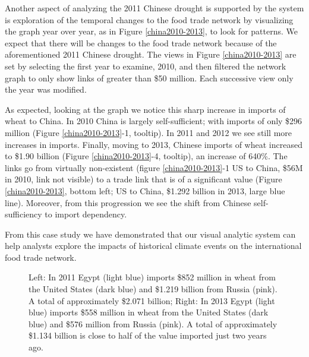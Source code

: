 Another aspect of analyzing the 2011 Chinese drought is supported by the system is exploration of the temporal changes to the food trade network by visualizing the graph year over year, as in Figure \ref{china2010-2013}, to look for patterns. We expect that there will be changes to the food trade network because of the aforementioned 2011 Chinese drought. The views in Figure \ref{china2010-2013} are set by selecting the first year to examine, 2010, and then filtered the network graph to only show links of greater than \$50 million. Each successive view only the year was modified.\par
As expected, looking at the graph we notice this sharp increase in imports of wheat to China. In 2010 China is largely self-sufficient; with imports of only \$296 million (Figure \ref{china2010-2013}-1, tooltip). In 2011 and 2012 we see still more increases in imports. Finally, moving to 2013, Chinese imports of wheat increased to \$1.90 billion (Figure \ref{china2010-2013}-4, tooltip), an increase of 640\%. The links go from virtually non-existent (figure \ref{china2010-2013}-1 US to China, \$56M in 2010, link not visible) to a trade link that is of a significant value (Figure \ref{china2010-2013}, bottom left; US to China, \$1.292 billion in 2013, large blue line). Moreover, from this progression we see the shift from Chinese self-sufficiency to import dependency.\par
From this case study we have demonstrated that our visual analytic system can help analysts explore the impacts of historical climate events on the international food trade network. 
\begin{figure}[htb]
	\caption[PROGRESSION OF EGYPT WHEAT IMPORTS FROM 2011 TO 2013]{Left: {In 2011 Egypt (light blue) imports \$852 million in wheat from the United States (dark blue) and \$1.219 billion from Russia (pink). A total of approximately \$2.071 billion}; Right: {In 2013 Egypt (light blue) imports \$558 million in wheat from the United States (dark blue) and \$576 million from Russia (pink). A total of approximately \$1.134 billion is close to half of the value imported just two years ago.}}
	\label{egypt2011-2013}
\end{figure}
